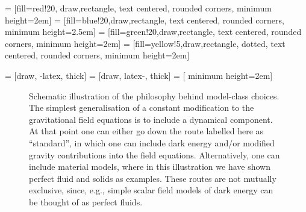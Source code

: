
 = [fill=red!20, draw,rectangle,  text centered, rounded corners, minimum height=2em]
 = [fill=blue!20,draw,rectangle,  text centered, rounded corners, minimum height=2.5em]
 = [fill=green!20,draw,rectangle,  text centered, rounded corners, minimum height=2em]
 = [fill=yellow!5,draw,rectangle,   dotted, text centered, rounded corners, minimum height=2em]

 = [draw,  -latex,   thick]
 = [draw,  latex-,   thick]
 = [ minimum height=2em]

\begin{figure}[!t]
\begin{centering}
\caption{Schematic illustration of the philosophy behind model-class choices. The simplest generalisation of a constant modification to the gravitational field equations is to include a dynamical component. At that point one can either go down the route labelled here as ``standard'', in which one can include dark energy and/or modified gravity contributions into the field equations. Alternatively, one can include material models, where in this illustration we have shown perfect fluid and solids as examples. These routes are not mutually exclusive, since, e.g.,  simple scalar field models of dark energy can be thought of as perfect fluids.}\label{fig:shem_roadmap-gen-st-mat-mod}
\end{centering}
\end{figure}
 